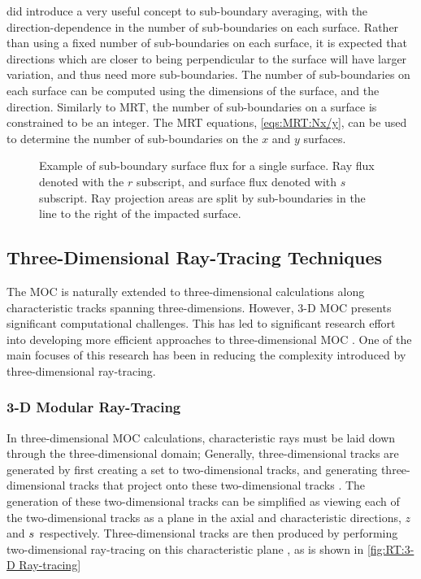 {{{{        \citet{Liu2014} did introduce a very useful concept to sub-boundary averaging, with the direction-dependence in the number of sub-boundaries on each surface.
        Rather than using a fixed number of sub-boundaries on each surface, it is expected that directions which are closer to being perpendicular to the surface will have larger variation, and thus need more sub-boundaries.
        The number of sub-boundaries on each surface can be computed using the dimensions of the surface, and the direction.
        Similarly to \ac{MRT}, the number of sub-boundaries on a surface is constrained to be an integer.
        The \ac{MRT} equations, \cref{eqs:MRT:Nx/y}, can be used to determine the number of sub-boundaries on the $x$ and $y$ surfaces.

        \begin{figure}
          \centering
          \def\svgwidth{0.75\linewidth}
          
          \caption{
            Example of sub-boundary surface flux for a single surface.
            Ray flux denoted with the $r$ subscript, and surface flux denoted with $s$ subscript.
            Ray projection areas are split by sub-boundaries in the line to the right of the impacted surface.
            \label{fig:RT:2D SubBoundarySurfaceFlux}}
        \end{figure}
      }
    }

    \subsection{Three-Dimensional Ray-Tracing Techniques}{\label{ssec:RT:Three-Dimensional Ray-Tracing Techniques}
      The \ac{MOC} is naturally extended to three-dimensional calculations along characteristic tracks spanning three-dimensions.
      However, 3-D \ac{MOC} presents significant computational challenges.
      This has led to significant research effort into developing more efficient approaches to three-dimensional \ac{MOC} \cite{Kochunas2013,Tramm2016,Yamamoto2017,Graziano2017,Gunow2017}.
      One of the main focuses of this research has been in reducing the complexity introduced by three-dimensional ray-tracing.

      \subsubsection{3-D Modular Ray-Tracing}{\label{sssec:RT:3D Modular Ray-Tracing}
        In three-dimensional \ac{MOC} calculations, characteristic rays must be laid down through the three-dimensional domain;
        Generally, three-dimensional tracks are generated by first creating a set to two-dimensional tracks, and generating three-dimensional tracks that project onto these two-dimensional tracks \cite{Kochunas2013,Shaner2015}.
        The generation of these two-dimensional tracks can be simplified as viewing each of the two-dimensional tracks as a plane in the axial and characteristic directions, $z$ and $\len$ respectively.
        Three-dimensional tracks are then produced by performing two-dimensional ray-tracing on this characteristic plane \cite{Kochunas2013}, as is shown in \cref{fig:RT:3-D Ray-tracing}

}}}}
